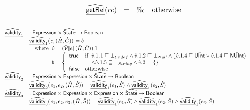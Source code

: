 \[\begin{array}{ll}

& \begin{array}{lll}
  \ahf{getRel}(re) &=& \O \quad\owc
\end{array}\\\\

\end{array}
\]
\[
\begin{array}{ll}

\widehat{\underline{\sf validity}}_1 & : \sf{Expression} \times \widehat{\mbox{\textsf{State}}} \rightarrow {\sf Boolean}\\
& \widehat{\underline{\sf validity}}_1(e, (\hat{H}, \hat{C})) = b\\
& \quad{\rm where}\begin{array}[t]{l}
  \hat{v} = (\hat{\mathcal{V}} \llbracket e \rrbracket (\hat{H}, \hat{C})).1\\
  b = \left\{
    \begin{array}{ll}
      \mbox{\textsf{true}} & 
        {\rm if}\begin{array}[t]{l} \hat{v}.1.1 \sqsubseteq \bot_{Undef} \land \hat{v}.1.2 \sqsubseteq \bot_{Null} \land (\hat{v}.1.4 \sqsubseteq \hat{\sf UInt} \lor \hat{v}.1.4 \sqsubseteq \hat{\sf NUInt})\\
           \land \hat{v}.1.5 \sqsubseteq \bot_{String} \land \hat{v}.2 = \{\} \end{array}\\
      \mbox{\textsf{false}} & {\rm otherwise}
    \end{array}
  \right.
\end{array}\\

\widehat{\underline{\sf validity}}_2 & : \sf{Expression} \times \sf{Expression} \times \widehat{\mbox{\textsf{State}}} \rightarrow {\sf Boolean}\\
& \widehat{\underline{\sf validity}}_2(e_1, e_2, (\hat{H}, \hat{S})) = \widehat{\underline{\sf validity}}_1(e_1, \hat{S}) \land \widehat{\underline{\sf validity}}_1(e_2, \hat{S})\\

\widehat{\underline{\sf validity}}_3 & : \sf{Expression} \times \sf{Expression} \times \sf{Expression} \times \widehat{\mbox{\textsf{State}}} \rightarrow {\sf Boolean}\\
& \widehat{\underline{\sf validity}}_3(e_1, e_2, e_3, (\hat{H}, \hat{S})) = \widehat{\underline{\sf validity}}_1(e_1, \hat{S}) \land \widehat{\underline{\sf validity}}_1(e_2, \hat{S}) \land \widehat{\underline{\sf validity}}_1(e_3, \hat{S})\\



  \end{array}
\]


